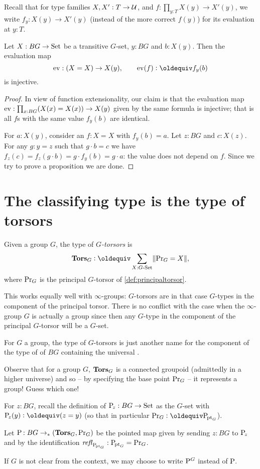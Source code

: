 Recall that for type families $X,X':T\to{\mathcal{U}}$, and
$f:\prod_{y:T}X(y)\to X'(y)$, we write $f_y:X(y)\to X'(y)$ (instead of
the more correct $f(y)$) for its evaluation at $y:T$.
\begin{lemma}
  \label{lem:evisinjwhentransitive}
  Let $X:BG\to\mathord{\mathrm{Set}}$ be a transitive $G$-set, $y:BG$ and $b:X(y)$.  Then the evaluation map
$$\mathrm{ev}:(X=X)\to X(y),\qquad \mathrm{ev}(f)\defequi f_y(b)$$
is injective.
\end{lemma}
\begin{proof}
  In view of function extensionality, our claim is that the evaluation
  map $\mathrm{ev}:\prod_{x:BG}(X(x)=X(x))\to X(y)$ given by the same formula
  is injective; that is all $f$s with the same value $f_y(b)$ are
  identical.

  For $a:X(y)$, consider an $f:X=X$ with $f_y(b)=a$.  Let $z:BG$ and
  $c:X(z)$.  For any $g:y=z$ such that $g\cdot b=c$ we have
  $f_z(c)=f_z(g\cdot b)=g \cdot f_y(b)=g \cdot a$: the value does not
  depend on $f$. Since we try to prove a proposition we are done.
\end{proof}



\section{The classifying type is the type of torsors}
\label{sec:torsors}
\begin{definition}
  Given a group  $G$, the type of {\em$G$-torsors} is
$$\typetorsor_G\defequi\sum_{X:\GSet}\Trunc{\princ G=X},$$
where $\mathrm{Pr}_{{G}}$ is the principal $G$-torsor of \cref{def:principaltorsor}.
\end{definition}
\begin{remark}
  This works equally well with $\infty$-groups: $G$-torsors are in that case $G$-types in the component of the principal torsor.  There is no conflict with the case when the $\infty$-group $G$ is actually a group since then any $G$-type in the component of the principal $G$-torsor will be a $G$-set.
\end{remark}

\begin{remark}
  For $G$ a group, the type of $G$-torsors is just another name for the component of the type of \coverings of $BG$ containing the universal \covering.

Observe that for a group $G$, $\mathbf{Tors}_G$ is a connected groupoid (admittedly in a higher universe) and so -- by specifying the base point $\mathrm{Pr}_{{G}}$ -- it represents a group!  Guess which one!
\end{remark}
\begin{remark}
  \label{def:BG2TorsG}
  For $z:BG$, recall the definition of $\mathrm{P}_{\!z}:BG\to\mathord{\mathrm{Set}}$ as the
  $G$-set with $\pathsp z(y)\defequi(z=y)$ (so that in particular
  $\princ G\defequi\pathsp{\pt_G}$).

  Let $\mathrm{P}_{\!}:BG\to_*(\mathbf{Tors}_G,\mathrm{Pr}_{{G}})$ be the pointed map given by sending $z:BG$ to $\mathrm{P}_{\!z}$ and by the identification $\mathop{\mathit{refl}_{\mathrm{P}_{\!\mathrm{pt}_G}}}:\mathrm{P}_{\!\mathrm{pt}_G}=\mathrm{Pr}_{{G}}$. 
\end{remark}
If $G$ is not clear from the context, we may choose to write $\mathrm{P}_{\!}^G$ instead of $\mathrm{P}_{\!}$.

